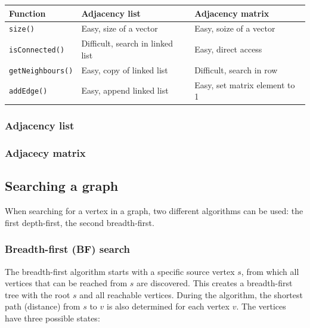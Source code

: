 \begin{table}[H]
    \centering
    \begin{tabular}{p{30mm} | p{50mm} | p{50mm}}
        \toprule
        \textbf{Function} & \textbf{Adjacency list} & \textbf{Adjacency matrix} \\
        \midrule
        \lstinline|size()| & Easy, size of a vector & Easy, soize of a vector \\
        \midrule
        \lstinline|isConnected()| & Difficult, search in linked list & Easy, direct access \\
        \midrule
        \lstinline|getNeighbours()| & Easy, copy of linked list & Difficult, search in row \\
        \midrule
        \lstinline|addEdge()| & Easy, append linked list & Easy, set matrix element to 1 \\
        \bottomrule
    \end{tabular}
\end{table}

\subsubsection{Adjacency list}

%

\subsubsection{Adjacecy matrix}

%

\subsection{Searching a graph}

When searching for a vertex in a graph, two different algorithms can be used: the first depth-first, the second breadth-first.

\subsubsection{Breadth-first (BF) search}

The breadth-first algorithm starts with a specific source vertex $s$, from which all vertices that can be reached from $s$ are discovered. This creates a breadth-first tree with the root $s$ and all reachable vertices.  During the algorithm, the shortest path (distance) from $s$ to $v$ is also determined for each vertex $v$. The vertices have three possible states:

